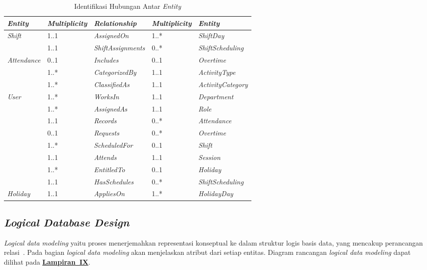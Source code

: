 \FloatBarrier
\begin{longtable}{ |p{2cm}|p{3cm}|p{3cm}|p{3cm}|p{3cm}|}
\caption{Identifikasi Hubungan Antar \textit{Entity}}\label{tab:indentifikasi-hubungan-antar-entity} 
\\
\hline
\textbf{\textit{Entity}}
&\textbf{\textit{Multiplicity}}
&\textbf{\textit{Relationship}}
&\textbf{\textit{Multiplicity}}
&\textbf{\textit{Entity}}
\\ 
\hline

\multirow{2}{*}{\textit{Shift}}
&1..1
&\textit{AssignedOn}
&1..*
&\textit{ShiftDay}
\\ 
\cline{2-5}
&1..1
&\textit{ShiftAssignments}
&0..*
&\textit{ShiftScheduling}
\\ 
\hline

\multirow{3}{*}{\textit{Attendance}}
&0..1
&\textit{Includes}
&0..1
&\textit{Overtime}
\\
\cline{2-5}
&1..*
&\textit{CategorizedBy}
&1..1
&\textit{ActivityType}
\\ 
\cline{2-5}
&1..*
&\textit{ClassifiedAs}
&1..1
&\textit{ActivityCategory}
\\ 
\hline

\multirow{8}{*}{\textit{User}}
&1..*
&\textit{WorksIn}
&1..1
&\textit{Department}
\\
\cline{2-5}
&1..*
&\textit{AssignedAs}
&1..1
&\textit{Role}
\\ 
\cline{2-5}
&1..1
&\textit{Records}
&0..*
&\textit{Attendance}
\\ 
\cline{2-5}
&0..1
&\textit{Requests}
&0..*
&\textit{Overtime}
\\ 
\cline{2-5}
&1..*
&\textit{ScheduledFor}
&0..1
&\textit{Shift}
\\ 
\cline{2-5}
&1..1
&\textit{Attends}
&1..1
&\textit{Session}
\\ 
\cline{2-5}
&1..*
&\textit{EntitledTo}
&0..1
&\textit{Holiday}
\\ 
\cline{2-5}
&1..1
&\textit{HasSchedules}
&0..*
&\textit{ShiftScheduling}
\\ 
\hline

\textit{Holiday}
&1..1
&\textit{AppliesOn}
&1..*
&\textit{HolidayDay}
\\ 
\hline


\end{longtable}

\subsection{\textit{Logical Database Design}}
\textit{Logical data modeling} yaitu proses menerjemahkan representasi konseptual ke dalam struktur logis basis data, yang mencakup perancangan relasi~\cite{conolly2015database}. Pada bagian \textit{logical data modeling} akan menjelaskan atribut dari setiap entitas. Diagram rancangan \textit{logical data modeling} dapat dilihat pada \hyperref[sec:logical-database-design]{\textbf{Lampiran~IX}}.

